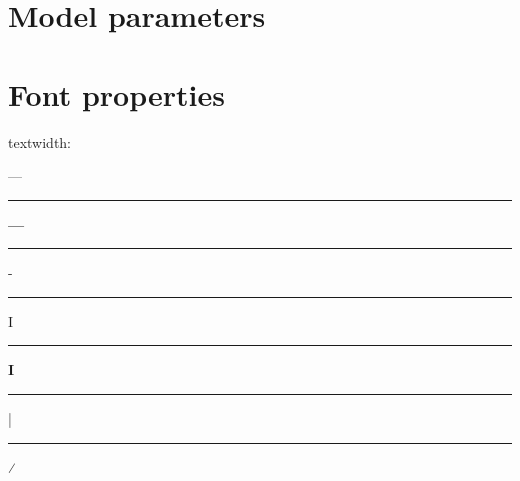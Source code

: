 \documentclass[12pt,oneside,letterpaper]{report}
\begin{document}

\appendix
% 



\chapter{Model parameters}\label{sec:jack}


\chapter{Font properties}

textwidth: \the\textwidth

\newlength{\myw}
\newlength{\myl}

---\rule[2.4pt]{12pt}{0.6pt}
\settowidth{\myw}{---}\the\myw

{\bf ---}\rule[2.2pt]{12pt}{1.1pt}

\settoheight{\myl}{---}\the\myl

-\rule[2.4pt]{3pt}{0.75pt}
I\rule{1.2pt}{8pt}
{\bf I}\rule{2.0pt}{8pt}
|\rule[-2pt]{0.6pt}{12pt}


⁄
\end{document}
